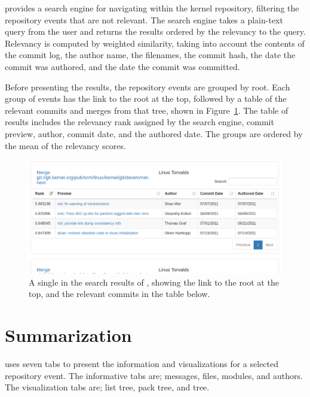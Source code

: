 
\tool{} provides a search engine for navigating within the kernel
repository, filtering the repository events that are not relevant. The
search engine takes a plain-text query from the user and returns the
results ordered by the relevancy to the query. Relevancy is computed by
weighted similarity, taking into account the contents of the commit log,
the author name, the filenames, the commit hash, the date the commit was
authored, and the date the commit was committed.

Before presenting the results, the repository events are grouped by
\mt{} root. Each group of events has the link to the root at the
top, followed by a table of the relevant commits and merges from that
tree, shown in Figure~\ref{fig:linvis_search_results}. The table of
results includes the relevancy rank assigned by the search engine,
commit preview, author, commit date, and the authored date. The
\mt{} groups are ordered by the mean of the relevancy scores.

\begin{figure}[htpb]
  \centering
  \includegraphics[width=0.9\linewidth]{Figures/Linvis/search_results.png}
  \caption{A single \mt{} in the search results of \tool{}, showing
    the link to the root at the top, and the relevant commits in the
    table below.}
  \label{fig:linvis_search_results}
\end{figure}

\section{Summarization}\label{sec:summarization}

\tool{} uses seven tabs to present the information and visualizations
for a selected repository event. The informative tabs are; messages,
files, modules, and authors. The visualization tabs are; list tree, pack
tree, and \rt{} tree.

